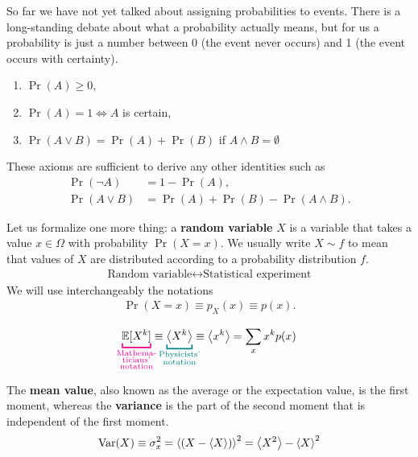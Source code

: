 So far we have not yet talked about assigning probabilities to events. There is a long-standing debate about what a probability actually means, but for us a probability is just a number between 0 (the event never occurs) and 1 (the event occurs with certainty).

\begin{definition}\leavevmode
	
	\begin{enumerate}
		\item $\Pr(A) \ge 0$,
		\item $\Pr(A) =1 \iff A$ is certain,
		\item $\Pr(A\vee B) = \Pr(A)+\Pr(B)$ if $A\wedge B  =\emptyset$
	\end{enumerate}
\end{definition}
These axioms are sufficient to derive any other identities such as 
\begin{align}
	\Pr(\neg A) &= 1-\Pr(A), \\
	\Pr(A\vee B) &= \Pr(A) + \Pr(B) - \Pr(A\wedge B).
\end{align}

Let us formalize one more thing: a {\bf random variable} $X$ is a variable that takes a value $x\in \Omega$ with probability $\Pr(X=x)$. We usually write $X\sim f$ to mean that values of $X$ are distributed according to a probability distribution $f$.
\begin{align*}
	\boxed{\textrm{Random variable} \leftrightarrow \textrm{Statistical experiment}}
\end{align*}
We will use interchangeably the notations 
\begin{align}
	\Pr(X=x) \equiv p_X(x) \equiv p(x).
\end{align}
\begin{definition}[\bf $k$th moment]\leavevmode
	\begin{align}
		{\color{magenta}\underbracket{\color{black}\E[X^k]}_{\mathclap{\substack{\textrm{Mathema-} \\ \textrm{ticians'} \\ \textrm{notation}}}}} \equiv {\color{teal}\underbracket{\color{black}\av{X^k}}_{\mathclap{\substack{\textrm{Physicists'} \\ \textrm{notation}}}}}
		\equiv \av{x^k} = \sum_x x^k p(x)
	\end{align}
\end{definition}
\noindent The {\bf mean value}, also known as the average or the expectation value, is the first moment, whereas
the {\bf variance} is the part of the second moment that is independent of the first moment. 
\begin{align}
	\textrm{Var}(X) \equiv \sigma_x^2 = \left\langle (X-\left\langle X \right\rangle) \right\rangle^2 = \left\langle X^2 \right\rangle - \left\langle X \right\rangle^2
\end{align}

